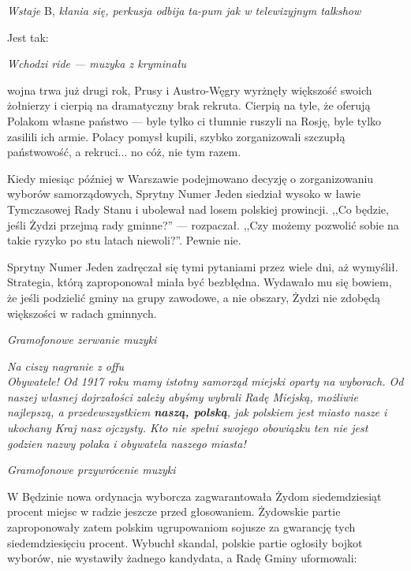 \documentclass[11pt,a4paper,oneside]{article}
\begin{document}
{\color{light-gray} \emph{Wstaje} B, \emph{kłania się, perkusja odbija
ta-pum jak w telewizyjnym talkshow}}

Jest tak: 

{\color{light-gray} \emph{Wchodzi ride --- muzyka z kryminału}}

wojna trwa już drugi rok, Prusy i Austro-Węgry wyrżnęły większość
swoich żołnierzy i cierpią na dramatyczny brak rekruta. Cierpią na
tyle, że oferują Polakom własne państwo --- byle tylko ci tłumnie ruszyli na
Rosję, byle tylko zasilili ich armie. Polacy pomysł kupili, szybko 
zorganizowali szczupłą państwowość, a rekruci... no cóż, nie tym razem.

Kiedy miesiąc później w Warszawie podejmowano decyzję o zorganizowaniu wyborów
samorządowych, Sprytny Numer Jeden siedział wysoko w ławie Tymczasowej Rady Stanu
i ubolewał nad losem polskiej prowincji. ,,Co będzie, jeśli Żydzi przejmą
rady gminne?'' --- rozpaczał. ,,Czy możemy pozwolić sobie na takie ryzyko
po stu latach niewoli?''. Pewnie nie.

Sprytny Numer Jeden zadręczał się tymi pytaniami przez wiele dni, aż
wymyślił. Strategia, którą zaproponował miała być bezbłędna. Wydawało 
mu się bowiem, że jeśli podzielić gminy na grupy zawodowe, a nie obszary,
Żydzi nie zdobędą większości w radach gminnych. 

{\color{light-gray} \emph{Gramofonowe zerwanie muzyki}}

{\color{light-gray} \emph{Na ciszy nagranie z offu}}\\
\emph{Obywatele! Od 1917 roku mamy istotny samorząd miejski oparty na
wyborach. Od naszej własnej dojrzałości zależy abyśmy wybrali Radę
Miejską, możliwie najlepszą, a przedewszystkiem \textbf{naszą,
polską}, jak polskiem jest miasto nasze i ukochany Kraj nasz ojczysty.
Kto nie spełni swojego obowiązku ten nie jest godzien nazwy polaka
i obywatela naszego miasta!}

{\color{light-gray} \emph{Gramofonowe przywrócenie muzyki}}

W Będzinie nowa ordynacja wyborcza zagwarantowała Żydom siedemdziesiąt
procent miejsc w radzie jeszcze przed głosowaniem. Żydowskie partie
zaproponowały zatem polskim ugrupowaniom sojusze za gwarancję tych
siedemdziesięciu procent. Wybuchł skandal, polskie partie ogłosiły
bojkot wyborów, nie wystawiły żadnego kandydata, a Radę Gminy uformowali:
\end{document}

